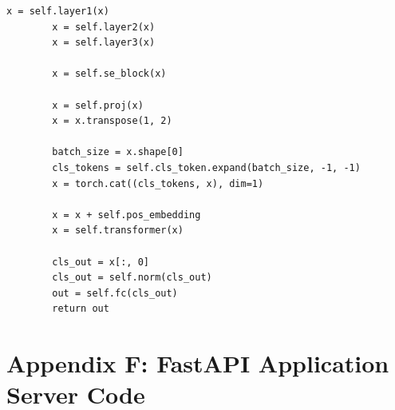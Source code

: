 \documentclass[12pt,a4paper]{report}
\begin{document}
\begin{lstlisting}[caption={Spatio-Temporal Hybrid Model (ResNet-Transformer) Architecture (src/models/hybrid.py)}]
        x = self.layer1(x)
        x = self.layer2(x)
        x = self.layer3(x)
        
        x = self.se_block(x)
        
        x = self.proj(x)
        x = x.transpose(1, 2)
        
        batch_size = x.shape[0]
        cls_tokens = self.cls_token.expand(batch_size, -1, -1)
        x = torch.cat((cls_tokens, x), dim=1)
        
        x = x + self.pos_embedding
        x = self.transformer(x)
        
        cls_out = x[:, 0]
        cls_out = self.norm(cls_out)
        out = self.fc(cls_out)
        return out
\end{lstlisting}

\clearpage

\chapter*{Appendix F: FastAPI Application Server Code}
\label{app:webapp}
\end{document}
